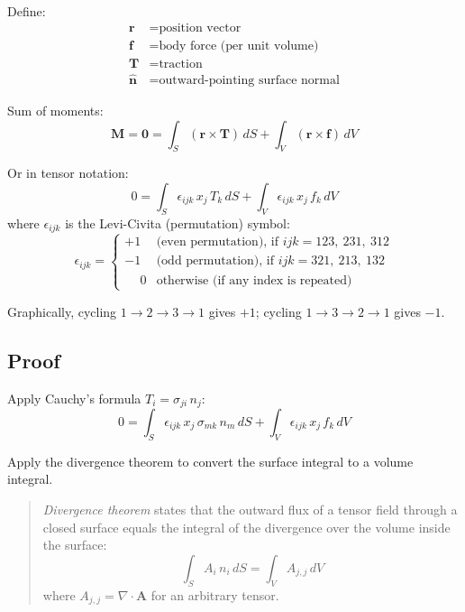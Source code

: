 \documentclass[11pt]{article}
\begin{document}
\noindent Define:
\begin{align}
  \bm{r}   &= \text{position vector}  \\
  \bm{f}   &= \text{body force (per unit volume)}  \\
  \bm{T}   &= \text{traction}  \\
  \hat{\bm{n}}      &= \text{outward-pointing surface normal}
\end{align}

\noindent Sum of moments:
\begin{equation}
  \bm{M} = \bm{0}
  = \int_S (\bm{r} \times \bm{T})\, dS
  + \int_V (\bm{r} \times \bm{f})\, dV
\end{equation}

\noindent Or in tensor notation:
\begin{equation}
  0 = \int_S \epsilon_{ijk}\, x_j\, T_k\, dS
    + \int_V \epsilon_{ijk}\, x_j\, f_k\, dV
\end{equation}
where $\epsilon_{ijk}$ is the Levi-Civita (permutation) symbol:
\begin{equation}
  \epsilon_{ijk} =
  \begin{cases}
    +1 & \text{(even permutation), if } ijk = 123,\ 231,\ 312 \\
    -1 & \text{(odd permutation), if } ijk = 321,\ 213,\ 132 \\
    \phantom{+}0  & \text{otherwise (if any index is repeated)}
  \end{cases}
\end{equation}

Graphically, cycling $1 \to 2 \to 3 \to 1$ gives $+1$; cycling $1 \to 3 \to 2 \to 1$ gives $-1$.

\subsection{Proof}

Apply Cauchy's formula $T_i = \sigma_{ji}\, n_j$:
\begin{equation}
  0 = \int_S \epsilon_{ijk}\, x_j\, \sigma_{mk}\, n_m\, dS
    + \int_V \epsilon_{ijk}\, x_j\, f_k\, dV
\end{equation}

Apply the divergence theorem to convert the surface integral to a volume integral.

\begin{quote}
\textit{Divergence theorem} states that the outward flux of a tensor field through a closed surface equals the integral of the divergence over the volume inside the surface:
\begin{equation}
  \int_S A_i\, n_i\, dS = \int_V A_{j,j}\, dV
\end{equation}
where $A_{j,j} = \nabla \cdot \bm{A}$ for an arbitrary tensor.
\end{quote}
\end{document}
